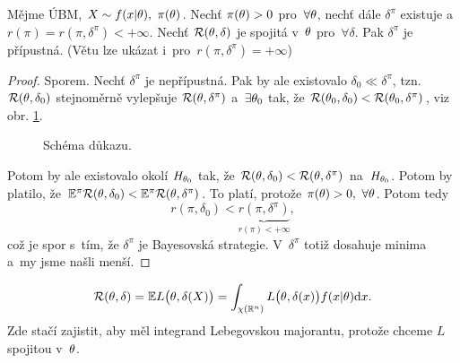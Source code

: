 \begin{theorem}
	Mějme ÚBM, $X\sim f(x|\theta),~\pi(\theta)$. Nechť $\pi(\theta)>0$ pro~$\forall\theta$, nechť dále $\delta^{\pi}$ existuje a~$r(\pi)=r(\pi,\delta^{\pi})<+\infty$. Nechť $\mathcal{R}(\theta,\delta)$ je spojitá v~$\theta$ pro~$\forall \delta$. Pak $\delta^\pi$ je přípustná. (Větu lze ukázat i~pro~$r(\pi,\delta^{\pi})=+\infty$)
	\begin{proof}
		Sporem. Nechť $\delta^\pi$ je nepřípustná. Pak by ale existovalo $\delta_0\ll\delta^\pi$, tzn. $\mathcal{R}(\theta,\delta_0)$ stejnoměrně vylepšuje $\mathcal{R}(\theta,\delta^\pi)$ a~$\exists\theta_0$ tak, že $\mathcal{R}(\theta_0,\delta_0)<\mathcal{R}(\theta_0,\delta^\pi)$, viz obr. \ref{fig:26}.
		\begin{figure}[h]
			\centering
			\caption{Schéma důkazu.}
			\label{fig:26}
		\end{figure}
		Potom by ale existovalo okolí $H_{\theta_0}$ tak, že $\mathcal{R}(\theta,\delta_0)<\mathcal{R}(\theta,\delta^\pi)$ na~$H_{\theta_0}$. Potom by platilo, že $\mathbb{E}^{\pi} \mathcal{R}(\theta,\delta_0)<\mathbb{E}^\pi \mathcal{R}(\theta,\delta^\pi)$. To platí, protože $\pi(\theta)>0,~\forall\theta$. Potom tedy 
		$$ r(\pi,\delta_0)<\underbrace{r(\pi,\delta^\pi)}_{r(\pi)<+\infty},$$ což je spor s~tím, že $\delta^{\pi}$ je Bayesovská strategie. V~$\delta^{\pi}$ totiž dosahuje minima a~my jsme našli menší.
	\end{proof} 
\end{theorem}
\begin{remark} $$\mathcal{R}(\theta,\delta)=\mathbb{E} L\big(\theta,\delta(X)\big)=\int_{\chi(\mathbb{R}^n)}L\big(\theta,\delta(x)\big)f(x|\theta)\mathrm{d} x.$$ Zde stačí zajistit, aby měl integrand Lebegovskou majorantu, protože chceme $L$ spojitou v~$\theta$.
	
\end{remark}

